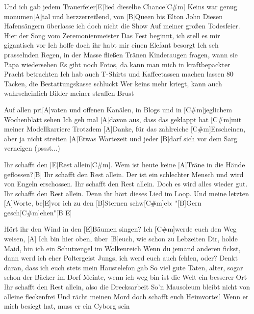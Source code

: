 



\begin{guitar}
	Und ich gab jedem Trauerfeier[E]lied dieselbe Chance[C#m]{}
	Keins war genug monumen[A]tal und herzzerreißend, von [B]Queen bis Elton John
	Diesen Hafensängern überlasse ich doch nicht die Show
	Auf meiner großen Todesfeier. Hier der Song vom Zeremonienmeister
	Das Fest beginnt, ich stell es mir gigantisch vor
	Ich hoffe doch ihr habt mir einen Elefant besorgt
	Ich seh prasselnden Regen, in der Masse fließen Tränen
	Kinderaugen fragen, wann sie Papa wiedersehen
	Es gibt noch Fotos, da kann man mich in kraftbepackter Pracht betrachten
	Ich hab auch T-Shirts und Kaffeetassen machen lassen
	80 Tacken, die Bestattungskasse schluckt
	Wer keins mehr kriegt, kann auch wahrscheinlich Bilder meiner straffen Brust
	
	Auf allen pri[A]vaten und offenen Kanälen, in Blogs und in [C#m]jeglichem Wochenblatt sehen
	Ich geh mal [A]davon aus, dass das geklappt hat [C#m]mit meiner Modellkarriere
	Trotzdem [A]Danke, für das zahlreiche [C#m]Erscheinen, aber ja nicht streiten
	[A]Etwas Wartezeit und jeder [B]darf sich vor dem Sarg verneigen (pssst...)
	
	Ihr schafft den [E]Rest allein[C#m].
	Wem ist heute keine [A]Träne in die Hände geflossen?[B]{}
	Ihr schafft den Rest allein.
	Der ist ein schlechter Mensch und wird von Engeln erschossen.
	Ihr schafft den Rest allein.
	Doch es wird alles wieder gut.
	Ihr schafft den Rest allein.
	Denn ihr hört dieses Lied im Loop.
	Und meine letzten [A]Worte, be[E]vor ich zu den [B]Sternen schw[C#m]eb:
	"[B]Gern gesch[C#m]ehen"[B E]{}
	
	Hört ihr den Wind in den [E]Bäumen singen? Ich [C#m]werde euch den Weg weisen, 
	[A] Ich bin hier oben, über [B]euch, wie schon zu Lebzeiten
	Dir, holde Maid, bin ich ein Schutzengel im Wolkenreich
	Wenn du jemand anderen fickst, dann werd ich eher Poltergeist
	Jungs, ich werd euch auch fehlen, oder?
	Denkt daran, dass ich euch stets mein Haustelefon gab
	So viel gute Taten, alter, sogar schon der Bäcker im Dorf
	Meinte, wenn ich weg bin ist die Welt ein besserer Ort
	Ihr schafft den Rest allein, also die Drecksarbeit
	So'n Mausoleum bleibt nicht von alleine fleckenfrei
	Und rächt meinen Mord doch schafft euch Heimvorteil
	Wenn er mich besiegt hat, muss er ein Cyborg sein
	

\end{guitar}
